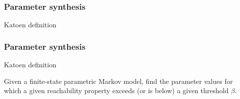 \documentclass{beamer}
\begin{document}
\begin{frame}
    \frametitle{Parameter synthesis}
    Katoen \cite{katoen2016probabilistic} definition
    \begin{definition}

    \end{definition}
\end{frame}

\begin{frame}
    \frametitle{Parameter synthesis}
    Katoen \cite{katoen2016probabilistic} definition
    \begin{definition}
        Given a finite-state parametric Markov model, find the parameter values for which a given
        reachability property exceeds (or is below) a given threshold $\beta$.
    \end{definition}
\end{frame}
\end{document}
